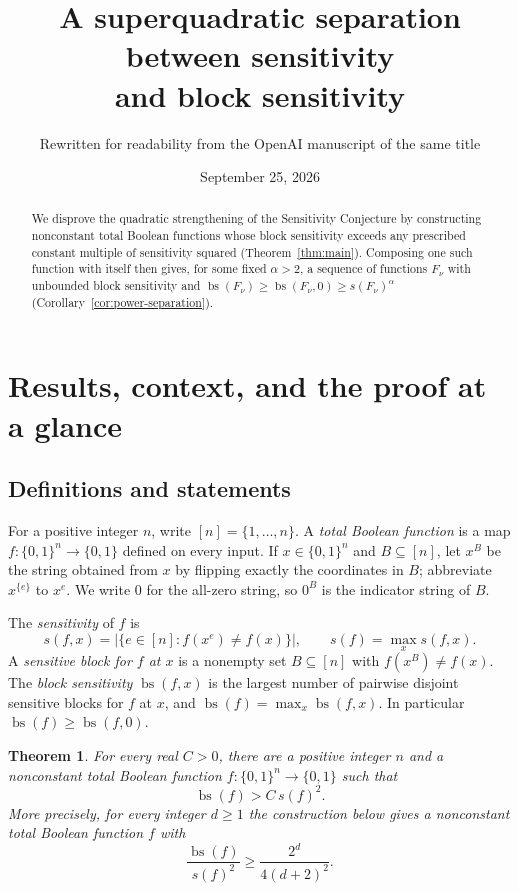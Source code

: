 \documentclass[11pt]{article}
\title{A superquadratic separation between sensitivity\\and block sensitivity}
\author{Rewritten for readability from the OpenAI manuscript of the same title}
\date{September 25, 2026}
\newcommand{\bs}{\operatorname{bs}}
\newtheorem{theorem}{Theorem}[section]
\theoremstyle{definition}
\theoremstyle{remark}
\begin{document}
\maketitle
\begin{abstract}
We disprove the quadratic strengthening of the Sensitivity Conjecture by
constructing nonconstant total Boolean functions whose block sensitivity
exceeds any prescribed constant multiple of sensitivity squared
(Theorem~\ref{thm:main}). Composing one such function with itself then gives,
for some fixed \(\alpha>2\), a sequence of functions \(F_\nu\) with unbounded
block sensitivity and
\(\bs(F_\nu)\ge\bs(F_\nu,0)\ge s(F_\nu)^\alpha\)
(Corollary~\ref{cor:power-separation}).
\end{abstract}

\section{Results, context, and the proof at a glance}
\label{sec:introduction}

\subsection{Definitions and statements}

For a positive integer \(n\), write \([n]=\{1,\ldots,n\}\).
A \emph{total Boolean function} is a map \(f:\{0,1\}^n\to\{0,1\}\) defined on
every input.
If \(x\in\{0,1\}^n\) and \(B\subseteq[n]\), let \(x^B\) be the string obtained
from \(x\) by flipping exactly the coordinates in \(B\); abbreviate
\(x^{\{e\}}\) to \(x^e\). We write \(0\) for the all-zero string, so \(0^B\)
is the indicator string of \(B\).

The \emph{sensitivity} of \(f\) is
\[
 s(f,x)=\bigl|\{e\in[n]:f(x^e)\ne f(x)\}\bigr|,
 \qquad s(f)=\max_x s(f,x).
\]
A \emph{sensitive block for \(f\) at \(x\)} is a nonempty set \(B\subseteq[n]\)
with \(f(x^B)\ne f(x)\). The \emph{block sensitivity} \(\bs(f,x)\) is the
largest number of pairwise disjoint sensitive blocks for \(f\) at \(x\), and
\(\bs(f)=\max_x\bs(f,x)\). In particular \(\bs(f)\ge\bs(f,0)\).

\begin{theorem}\label{thm:main}
For every real \(C>0\), there are a positive integer \(n\) and a
nonconstant total Boolean function \(f:\{0,1\}^n\to\{0,1\}\) such that
\[
 \bs(f)>C\,s(f)^2.
\]
More precisely, for every integer \(d\ge1\) the construction below gives
a nonconstant total Boolean function \(f\) with
\[
 \frac{\bs(f)}{s(f)^2}\ge \frac{2^d}{4(d+2)^2}.
\]
\end{theorem}
\end{document}
